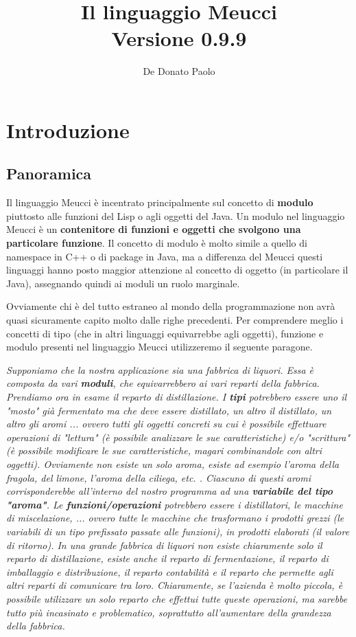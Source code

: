 \documentclass[10pt]{book}%
\author{De Donato Paolo}
\title{\textbf{\huge Il linguaggio Meucci\\
\large Versione 0.9.9}}
\date{}
\newcommand{\e}{\`{e} }
\renewcommand{\emph}[1]{\textbf{#1}}
\begin{document}
\maketitle
\tableofcontents
\chapter{Introduzione}
\section{Panoramica}
Il linguaggio Meucci \e incentrato principalmente sul concetto di \emph{modulo} piuttosto alle funzioni del Lisp o agli oggetti del Java. Un modulo nel linguaggio Meucci \e un \emph{contenitore di funzioni e oggetti che svolgono una particolare funzione}. Il concetto di modulo \e molto simile a quello di namespace in C++ o di package in Java, ma a differenza del Meucci questi linguaggi hanno posto maggior attenzione al concetto di oggetto (in particolare il Java), assegnando quindi ai moduli un ruolo marginale.

Ovviamente chi \e del tutto estraneo al mondo della programmazione non avr\`{a} quasi sicuramente capito molto dalle righe precedenti. Per comprendere meglio i concetti di tipo (che in altri linguaggi equivarrebbe agli oggetti), funzione e modulo presenti nel linguaggio Meucci utilizzeremo il seguente paragone.

\textit{Supponiamo che la nostra applicazione sia una fabbrica di liquori. Essa \e composta da vari \textbf{moduli}, che equivarrebbero ai vari reparti della fabbrica. Prendiamo ora in esame il reparto di distillazione. I \textbf{tipi} potrebbero essere uno il "mosto" gi\`{a} fermentato ma che deve essere distillato, un altro il distillato, un altro gli aromi ... ovvero tutti gli oggetti concreti su cui \e possibile effettuare operazioni di "lettura" (\e possibile analizzare le sue caratteristiche) e/o "scrittura" (\e possibile modificare le sue caratteristiche, magari combinandole con altri oggetti). Ovviamente non esiste un solo aroma, esiste ad esempio l'aroma della fragola, del limone, l'aroma della ciliega, etc. . Ciascuno di questi aromi corrisponderebbe all'interno del nostro programma ad una \textbf{variabile del tipo "aroma"}. Le \textbf{funzioni/operazioni} potrebbero essere i distillatori, le macchine di miscelazione, ... ovvero tutte le macchine che trasformano i prodotti grezzi (le variabili di un tipo prefissato passate alle funzioni), in prodotti elaborati (il valore di ritorno). In una grande fabbrica di liquori non esiste chiaramente solo il reparto di distillazione, esiste anche il reparto di fermentazione, il reparto di imballaggio e distribuzione, il reparto contabilit\`{a} e il reparto che permette agli altri reparti di comunicare tra loro. Chiaramente, se l'azienda \e molto piccola, \e possibile utilizzare un solo reparto che effettui tutte queste operazioni, ma sarebbe tutto pi\`{u} incasinato e problematico, soprattutto all'aumentare della grandezza della fabbrica.}
\end{document}
